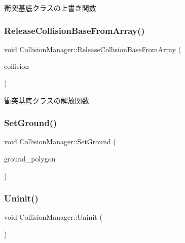 衝突基底クラスの上書き関数 

\mbox{\label{class_collision_manager_a34318163f4256cebc7aefb95fc475030}} 
\subsubsection{\texorpdfstring{Release\+Collision\+Base\+From\+Array()}{ReleaseCollisionBaseFromArray()}}
{\footnotesize\ttfamily void Collision\+Manager\+::\+Release\+Collision\+Base\+From\+Array (\begin{DoxyParamCaption}\item[{\mbox{\hyperlink{class_collision_base}{Collision\+Base}} $\ast$}]{collision }\end{DoxyParamCaption})}



衝突基底クラスの解放関数 

\mbox{\label{class_collision_manager_a63ce6003d8d042085d7b388a4cfa0666}} 
\subsubsection{\texorpdfstring{Set\+Ground()}{SetGround()}}
{\footnotesize\ttfamily void Collision\+Manager\+::\+Set\+Ground (\begin{DoxyParamCaption}\item[{\mbox{\hyperlink{class_mesh_plane_polygon}{Mesh\+Plane\+Polygon}} $\ast$}]{ground\+\_\+polygon }\end{DoxyParamCaption})}

\mbox{\label{class_collision_manager_abfa4b87f3ce102f0d173e112e7963f09}} 
\subsubsection{\texorpdfstring{Uninit()}{Uninit()}}
{\footnotesize\ttfamily void Collision\+Manager\+::\+Uninit (\begin{DoxyParamCaption}{ }\end{DoxyParamCaption})}



